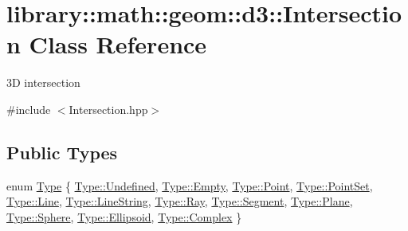\hypertarget{classlibrary_1_1math_1_1geom_1_1d3_1_1_intersection}{}\section{library\+:\+:math\+:\+:geom\+:\+:d3\+:\+:Intersection Class Reference}
\label{classlibrary_1_1math_1_1geom_1_1d3_1_1_intersection}


3D intersection  




{\ttfamily \#include $<$Intersection.\+hpp$>$}

\subsection*{Public Types}
\begin{DoxyCompactItemize}
\item 
enum \hyperlink{classlibrary_1_1math_1_1geom_1_1d3_1_1_intersection_a3465d607fd42380f350598e055271b05}{Type} \{ \newline
\hyperlink{classlibrary_1_1math_1_1geom_1_1d3_1_1_intersection_a3465d607fd42380f350598e055271b05aec0fc0100c4fc1ce4eea230c3dc10360}{Type\+::\+Undefined}, 
\hyperlink{classlibrary_1_1math_1_1geom_1_1d3_1_1_intersection_a3465d607fd42380f350598e055271b05ace2c8aed9c2fa0cfbed56cbda4d8bf07}{Type\+::\+Empty}, 
\hyperlink{classlibrary_1_1math_1_1geom_1_1d3_1_1_intersection_a3465d607fd42380f350598e055271b05a2a3cd5946cfd317eb99c3d32e35e2d4c}{Type\+::\+Point}, 
\hyperlink{classlibrary_1_1math_1_1geom_1_1d3_1_1_intersection_a3465d607fd42380f350598e055271b05aaedf8f48dfa5b704b6c12b415707a1da}{Type\+::\+Point\+Set}, 
\newline
\hyperlink{classlibrary_1_1math_1_1geom_1_1d3_1_1_intersection_a3465d607fd42380f350598e055271b05a4803e6b9e63dabf04de980788d6a13c4}{Type\+::\+Line}, 
\hyperlink{classlibrary_1_1math_1_1geom_1_1d3_1_1_intersection_a3465d607fd42380f350598e055271b05a2e321465690359abbb020a3619b1c937}{Type\+::\+Line\+String}, 
\hyperlink{classlibrary_1_1math_1_1geom_1_1d3_1_1_intersection_a3465d607fd42380f350598e055271b05a9406e3c325bfc9873426e5eda4ba6e18}{Type\+::\+Ray}, 
\hyperlink{classlibrary_1_1math_1_1geom_1_1d3_1_1_intersection_a3465d607fd42380f350598e055271b05a4b77e2a9d8e9cfc299f504b32d6e3d2b}{Type\+::\+Segment}, 
\newline
\hyperlink{classlibrary_1_1math_1_1geom_1_1d3_1_1_intersection_a3465d607fd42380f350598e055271b05a0d3adee051531c15b3509b4d4d75ce7b}{Type\+::\+Plane}, 
\hyperlink{classlibrary_1_1math_1_1geom_1_1d3_1_1_intersection_a3465d607fd42380f350598e055271b05ab7095f057db3fefa7325ad93a04e14fd}{Type\+::\+Sphere}, 
\hyperlink{classlibrary_1_1math_1_1geom_1_1d3_1_1_intersection_a3465d607fd42380f350598e055271b05aeee5397cecd880d16ef7244819aa383d}{Type\+::\+Ellipsoid}, 
\hyperlink{classlibrary_1_1math_1_1geom_1_1d3_1_1_intersection_a3465d607fd42380f350598e055271b05a10b4eb76294b70d7fd6df997ff06edb1}{Type\+::\+Complex}
 \}
\end{DoxyCompactItemize}
